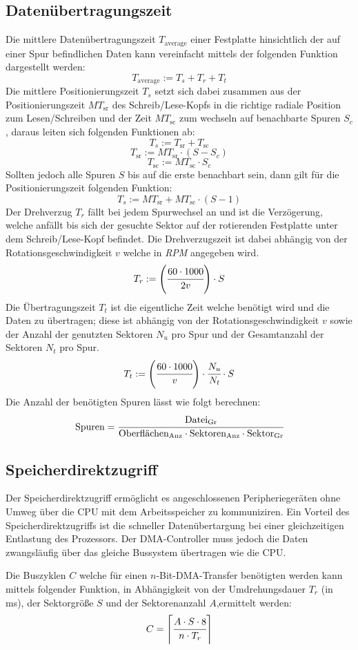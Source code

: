 \subsection{Datenübertragungszeit}
Die mittlere Datenübertragungszeit $T_{\text{average}}$ einer
Festplatte hinsichtlich der auf einer Spur befindlichen Daten kann
vereinfacht mittels der folgenden Funktion dargestellt werden:
\[
    T_{\text{average}} := T_{s} + T_{r} + T_{t}
\]
Die mittlere Positionierungszeit $T_{s}$ setzt sich dabei zusammen aus der 
Positionierungszeit $MT_{\text{sr}}$ des Schreib/Lese-Kopfs in die
richtige radiale Position zum Lesen/Schreiben und der Zeit $MT_{\text{sc}}$
zum wechseln auf benachbarte Spuren $S_{c}$, daraus leiten sich folgenden Funktionen ab:
\[
 T_{s} := T_{\text{sr}} + T_{\text{sc}}
\]
\[
 T_{\text{sr}} := MT_{\text{sr}}\cdot (S-S_{c})
\]
\[
 T_{\text{sc}} := MT_{\text{sc}}\cdot S_{c}
\]
Sollten jedoch alle Spuren $S$ bis auf die erste benachbart sein, dann gilt für
die Positionierungszeit folgenden Funktion:
\[
 T_{s} := MT_{\text{sr}} + MT_{\text{sc}}\cdot (S-1)
\]
Der Drehverzug $T_{r}$ fällt bei jedem Spurwechsel an und ist die Verzögerung,
welche anfällt bis sich der gesuchte Sektor auf der rotierenden Festplatte unter
dem Schreib/Lese-Kopf befindet. Die Drehverzugszeit ist dabei abhängig von der
Rotationsgeschwindigkeit $v$ welche in \emph{RPM} angegeben wird.
\[
 T_{r} := \left(\cfrac{60\cdot 1000}{2v}\right)\cdot S
\]
Die Übertragungszeit $T_{t}$ ist die eigentliche Zeit welche benötigt wird und die Daten
zu übertragen; diese ist abhängig von der Rotationsgeschwindigkeit $v$ sowie der Anzahl
der genutzten Sektoren $N_{u}$ pro Spur und der Gesamtanzahl der Sektoren $N_{t}$ pro Spur.
\[
 T_{t} := \left(\cfrac{60\cdot 1000}{v}\right)\cdot \cfrac{N_{u}}{N_{t}}\cdot S
\]
Die Anzahl der benötigten Spuren lässt wie folgt berechnen:
\[
\text{Spuren} = \cfrac{\text{Datei}_\text{Gr}}{\text{Oberflächen}_\text{Anz}\cdot \text{Sektoren}_\text{Anz}\cdot \text{Sektor}_\text{Gr}}
\]

\subsection{Speicherdirektzugriff}
Der Speicherdirektzugriff ermöglicht es angeschlossenen Peripheriegeräten ohne Umweg über
die CPU mit dem Arbeitsspeicher zu kommuniziren. Ein Vorteil des Speicherdirektzugriffs
ist die schneller Datenübertargung bei einer gleichzeitigen Entlastung des Prozessors.
Der DMA-Controller muss jedoch die Daten zwangsläufig über das gleiche Bussystem übertragen
wie die CPU. \par
Die Buszyklen $C$ welche für einen $n$-Bit-DMA-Transfer benötigten werden kann
mittels folgender Funktion, in Abhängigkeit von der Umdrehungsdauer $T_{r}$ (in ms), 
der Sektorgröße $S$ und der Sektorenanzahl $A$,ermittelt werden:
\[
 C = \left\lceil\cfrac{A\cdot S\cdot 8}{n\cdot T_{r}}\right\rceil
\]
